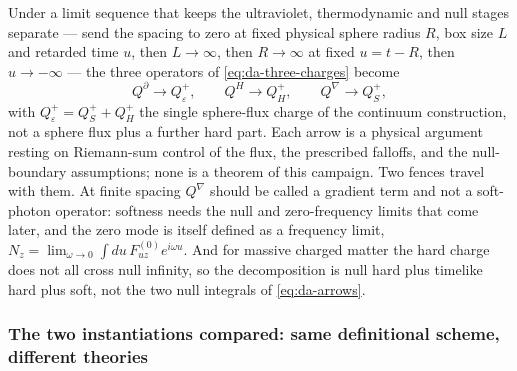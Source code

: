 \begin{observation}
\label{obs:da-gauss-arrow}
Under a limit sequence that keeps the ultraviolet, thermodynamic and null
stages separate --- send the spacing to zero at fixed physical sphere radius
$R$, box size $L$ and retarded time $u$, then $L\to\infty$, then $R\to\infty$ at
fixed $u=t-R$, then $u\to-\infty$ --- the three operators of
\eqref{eq:da-three-charges} become
\begin{equation}
  Q^{\partial}\longrightarrow Q^{+}_{\varepsilon},
  \qquad
  Q^{H}\longrightarrow Q^{+}_{H},
  \qquad
  Q^{\nabla}\longrightarrow Q^{+}_{S},
  \label{eq:da-arrows}
\end{equation}
with $Q^+_\varepsilon=Q^+_S+Q^+_H$ the single sphere-flux charge of the
continuum construction, not a sphere flux plus a further hard part. Each arrow
is a physical argument resting on Riemann-sum control of the flux, the
prescribed falloffs, and the null-boundary assumptions; none is a theorem of
this campaign. Two fences travel with them. At finite spacing $Q^{\nabla}$
should be called a gradient term and not a soft-photon operator: softness needs
the null and zero-frequency limits that come later, and the zero mode is itself
defined as a frequency limit, $N_z=\lim_{\omega\to0}\int du\,F^{(0)}_{uz}
e^{i\omega u}$. And for massive charged matter the hard charge does not all
cross null infinity, so the decomposition is null hard plus timelike hard plus
soft, not the two null integrals of \eqref{eq:da-arrows}.
\end{observation}


\subsubsection*{The two instantiations compared: same definitional scheme,
different theories}

